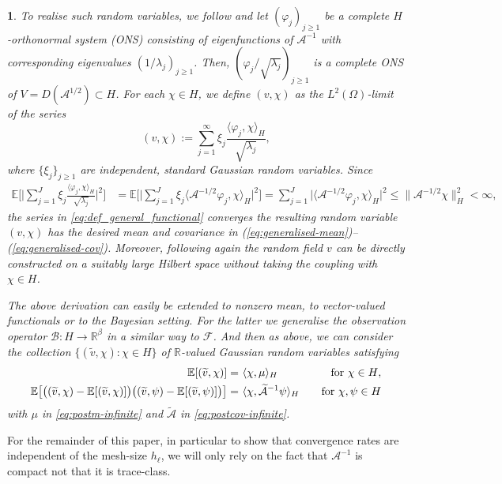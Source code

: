 \documentclass[11pt,english]{article}
\theoremstyle{plain}
\theoremstyle{plain}
\theoremstyle{plain}
\theoremstyle{plain}
\newtheorem{rem}[thm]{\protect\remarkname}
\numberwithin{equation}{section}
\newcommand{\rev}[1]{#1}
\providecommand{\remarkname}{Remark}
\begin{document}
\begin{rem}
To realise such random variables, we follow \cite[Section
4.1.2]{DaPrato.D_2014_book} and let $(\varphi_{j})_{j\geq1}$
be a complete $H$-orthonormal system (ONS) consisting of eigenfunctions
of $\mathcal{A}^{-1}$ with corresponding eigenvalues $(1/\lambda_{j})_{j\geq1}$. Then, $(\varphi_{j}/\sqrt{\lambda_{j}})_{j\geq1}$ is
a complete ONS of  $V =D(\mathcal{A}^{1/2})\subset
H$. For each $\chi \in H$, we define 
$(v,\chi)$ as the $L^{2}(\Omega)$-limit of the series
\begin{equation}\label{eq:def_general_functional}
  (v,\chi):= %
  \sum_{j=1}^{\infty} \xi_{j} \frac{ \langle \varphi_{j} , \chi \rangle_{H}}{\sqrt{\lambda_{j}}} 
,
\end{equation}
where $\{\xi_{j}\}_{j\geq1}$ are independent, standard
Gaussian random variables. Since
\begin{align*}
\mathbb{E}\bigg[\Big| \sum_{j=1}^{J} \xi_{j} \frac{ \langle
  \varphi_{j} , \chi \rangle_{H}}{\sqrt{\lambda_{j}}} 
  \Big|^{2}\bigg] & =\mathbb{E}\bigg[\Big| \sum_{j=1}^{J} \xi_{j}\langle\mathcal{A}^{-1/2}\varphi_{j},\chi\rangle_{H}\Big|^{2}\bigg]
=\sum_{j=1}^{J}\big|\langle\mathcal{A}^{-1/2}
                    \varphi_{j},\chi\rangle_{H}\big|^{2} \leq \|\mathcal{A}^{-1/2}\chi\|_{H}^{2}<\infty,
\end{align*}
the series in \eqref{eq:def_general_functional} converges the
resulting random variable $(v,\chi)$
has the desired mean and covariance in (\ref{eq:generalised-mean})--(\ref{eq:generalised-cov}). 
Moreover, following again \cite{DaPrato.D_2014_book} the random field $v$ can be directly constructed on a suitably large Hilbert space without taking the coupling with $\chi\in H$. 

The above derivation can easily be extended to nonzero mean, to
vector-valued functionals or to
the Bayesian setting.
For the latter we generalise the
observation operator $\mathfrak{\mathcal{B}}\colon
H\to\mathbb{R}^{\beta}$ in a similar way to $\mathcal{F}$. And then as above,
we can consider the collection $\{(\widetilde v,\chi) : \chi \in H\}$
of $\mathbb{R}$-valued Gaussian random variables satisfying 
\begin{align}
\mathbb{E}[(\widetilde v ,\chi)] = & \ \langle \chi,\mu\rangle_H \quad &\text{for \ensuremath{\chi\in H}},\label{eq:generalised-mean-post}\\
\mathbb{E}\bigl[\bigl((\widetilde v ,\chi)-\mathbb{E}[(\widetilde v ,\chi)]\bigr)\bigl((\widetilde v
  ,\psi)-\mathbb{E}[(\widetilde v ,\psi)]\bigr)\bigr] = & \ \langle
                                                    \chi, \widetilde{\mathcal{A}}^{-1}\psi\rangle_{H}\quad
                                                    &\text{for \ensuremath{\chi,\psi\in H}}\label{eq:generalised-cov-post}
\end{align}
with $\mu$ in \eqref{eq:postm-infinite} and $\widetilde{\mathcal{A}}$ in \eqref{eq:postcov-infinite}.
\end{rem}
\noindent
For the remainder of this paper, in particular to show \rev{that convergence rates are independent of the mesh-size $h_\ell$}, we will only rely on the fact that $\mathcal{A}^{-1}$ is compact not that it is trace-class.
\end{document}
